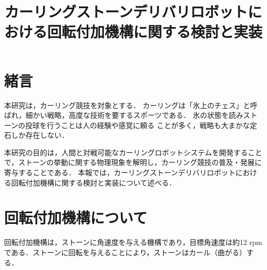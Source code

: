 \documentclass{classes/sice-si}
\title{カーリングストーンデリバリロボットにおける回転付加機構に関する検討と実装} %
\begin{document}


\maketitle

\section{緒言}
本研究は，カーリング競技を対象とする．
カーリングは「氷上のチェス」と呼ばれ，細かい戦略，高度な技術を要するスポーツである．
氷の状態を読みストーンの投球を行うことは人の経験や感覚に頼る
ことが多く，戦略も大まかな定石しか存在しない．

本研究の目的は，人間と対戦可能なカーリングロボットシステムを開発することで，ストーンの挙動に関する物理現象を解明し，カーリング競技の普及・発展に寄与することである．
本報では，カーリングストーンデリバリロボットにおける回転付加機構に関する検討と実装について述べる．
\section{回転付加機構について}
回転付加機構は，ストーンに角速度を与える機構であり，目標角速度は約12 rpmである．ストーンに回転を与えることにより，ストーンはカール（曲がる）する．
\end{document}
